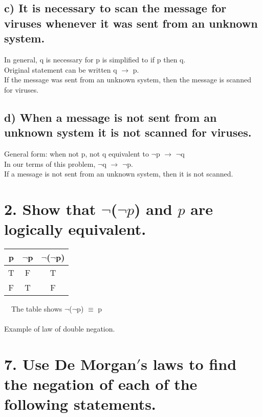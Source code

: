 \documentclass[11pt, oneside]{article} %
\numberwithin{equation}{section} %
\numberwithin{figure}{section} %
\begin{document}
\subsection{c) It is necessary to scan the message for viruses whenever it was sent from an unknown system.}
In general, q is necessary for p is simplified to if p then q. \\
Original statement can be written q $\rightarrow$ p. \\
If the message was sent from an unknown system, then the message is scanned for viruses.
\subsection{d) When a message is not sent from an unknown system it is not scanned for viruses.}
General form: when not p, not q equivalent to $\neg$p $\rightarrow$ $\neg$q \\
In our terms of this problem, $\neg$q $\rightarrow$ $\neg$p.\\
If a message is not sent from an unknown system, then it is not scanned.\\

\section{}
\begin{table}[!htp]
\section{2. Show that $\neg$($\neg$$p$) and $p$ are logically equivalent.}
\begin{tabular}{c c c}
\hline\hline
p & $\neg$p &  $\neg$($\neg$p) \\ [0.5ex] %
\hline
T & F & T\\
F & T & F \\ [1ex]
\hline
\end{tabular}
$\quad$The table shows $\neg$($\neg$p) $\equiv$ p \\
\\
Example of law of double negation.
\label{table:nonlin}
\end{table}

\section{7. Use De Morgan$'$s laws to find the negation of each of the following statements.}
\end{document}
